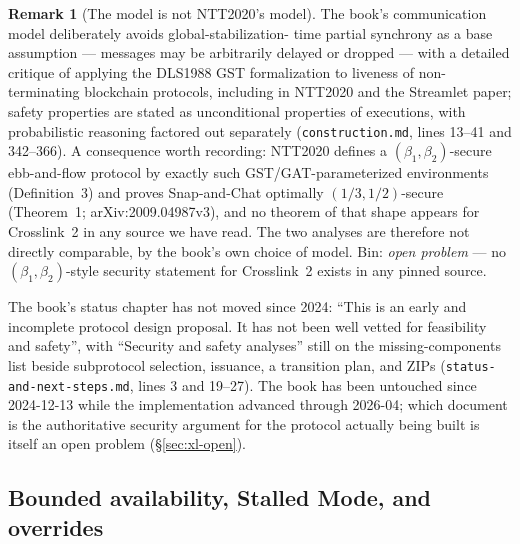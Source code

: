 \documentclass[11pt,a4paper]{article}
\theoremstyle{definition}
\newtheorem{remark}[theorem]{Remark}
\begin{document}
\begin{remark}[The model is not NTT2020's model]\label{rem:xl-model}
The book's communication model deliberately avoids global-stabilization-%
time partial synchrony as a base assumption --- messages may be arbitrarily
delayed or dropped --- with a detailed critique of applying the DLS1988
GST formalization to liveness of non-terminating blockchain protocols,
including in NTT2020 and the Streamlet paper; safety properties are stated
as unconditional properties of executions, with probabilistic reasoning
factored out separately (\texttt{construction.md}, lines 13--41 and
342--366). A consequence worth recording: NTT2020 defines a
$(\beta_1, \beta_2)$-secure ebb-and-flow protocol by exactly such
GST/GAT-parameterized environments (Definition~3) and proves Snap-and-Chat
optimally $(1/3, 1/2)$-secure (Theorem~1; arXiv:2009.04987v3), and no
theorem of that shape appears for Crosslink~2 in any source we have read.
The two analyses are therefore not directly comparable, by the book's own
choice of model. Bin: \emph{open problem} --- no
$(\beta_1, \beta_2)$-style security statement for Crosslink~2 exists in
any pinned source.
\end{remark}

The book's status chapter has not moved since 2024: ``This is an early and
incomplete protocol design proposal. It has not been well vetted for
feasibility and safety'', with ``Security and safety analyses'' still on
the missing-components list beside subprotocol selection, issuance, a
transition plan, and ZIPs (\texttt{status-and-next-steps.md}, lines 3 and
19--27). The book has been untouched since 2024-12-13 while the
implementation advanced through 2026-04; which document is the
authoritative security argument for the protocol actually being built is
itself an open problem (\S\ref{sec:xl-open}).

\subsection{Bounded availability, Stalled Mode, and overrides}
\label{sec:xl-bounded}
\end{document}
